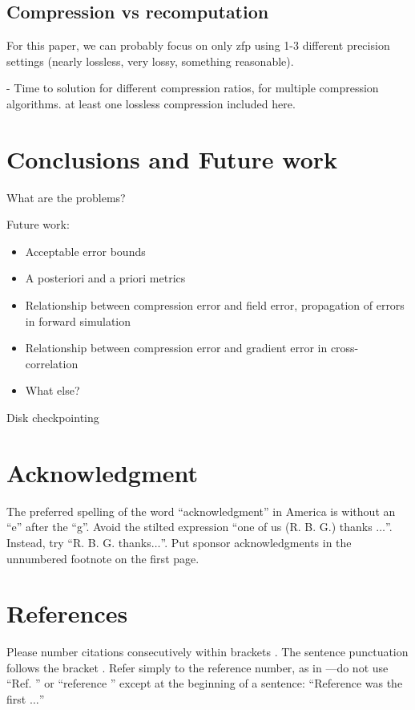 \documentclass[conference]{IEEEtran}
\begin{document}
\subsection{Compression vs recomputation}

For this paper, we can probably focus on only zfp using 1-3 different precision settings
(nearly lossless, very lossy, something reasonable).

- Time to solution for different compression ratios, for multiple
compression algorithms. at least one lossless compression included
here.



\section{Conclusions and Future work}

What are the problems?

Future work:
\begin{itemize}
\item Acceptable error bounds
\item A posteriori and a priori metrics
\item Relationship between compression error and field error, propagation of errors in forward simulation
\item Relationship between compression error and gradient error in cross-correlation
\item What else?
\end{itemize}

Disk checkpointing

\section*{Acknowledgment}

The preferred spelling of the word ``acknowledgment'' in America is without 
an ``e'' after the ``g''. Avoid the stilted expression ``one of us (R. B. 
G.) thanks $\ldots$''. Instead, try ``R. B. G. thanks$\ldots$''. Put sponsor 
acknowledgments in the unnumbered footnote on the first page.

\section*{References}

Please number citations consecutively within brackets \cite{b1}. The 
sentence punctuation follows the bracket \cite{b2}. Refer simply to the reference 
number, as in \cite{b3}---do not use ``Ref. \cite{b3}'' or ``reference \cite{b3}'' except at 
the beginning of a sentence: ``Reference \cite{b3} was the first $\ldots$''
\end{document}
